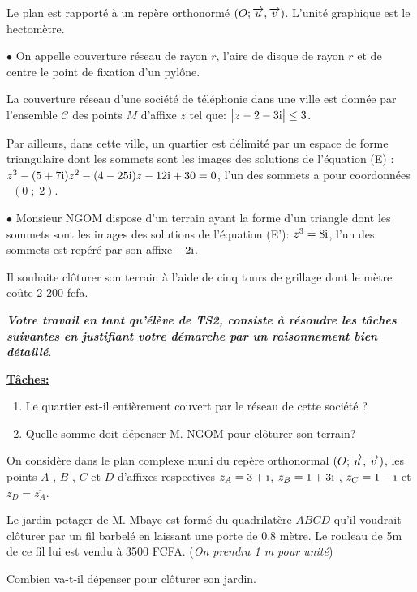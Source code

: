 \begin{exercice}
\noindent
Le plan  est rapporté à un repère  orthonormé $ (O ;\overrightarrow{u},\overrightarrow{v}) $. L'unité graphique  est le  hectomètre.
\medskip

\noindent\textbf{$  \bullet$}\; 
 On appelle couverture réseau de rayon $ r $, l'aire de disque de rayon $ r $ et de centre le point de fixation d'un pylône.

\noindent La couverture réseau d'une
société de téléphonie dans une ville  est donnée par l'ensemble  $\mathcal{C}$ des points $M$ d'affixe $z$ tel que:
 $ \bigl|z -2-3\text{i}\bigr| \leq 3$. 
 
 \smallskip
 \noindent Par ailleurs, dans cette ville, un quartier est délimité par un espace de forme triangulaire
dont les sommets sont les images des  solutions de l'équation (E) :\; 
  $ z^3 -(5+7\text{i})z^2 - (4-25\text{i})z -12\text{i}+30=0$, l'un des sommets a pour coordonnées \, $ (0  \; ; \;  2) $. 


\bigskip

\noindent \textbf{$  \bullet$}\;  Monsieur NGOM dispose d'un terrain ayant la forme d'un triangle dont les sommets sont 
les  images des solutions de  l'équation (E'):\; $ z^3=8\text{i} $,\; l'un des sommets est repéré par son affixe $ -2\text{i} $. 


\noindent  Il souhaite clôturer son terrain à l'aide de cinq tours de
grillage dont le mètre coûte 2 200 fcfa.




\medskip

\noindent  \textbf{\textit{Votre travail en tant qu'élève de TS2, consiste à résoudre les tâches suivantes en justifiant votre démarche par un raisonnement bien détaillé}}.

\medskip

\textbf{\underline{Tâches:}}
\begin{enumerate}
\item Le quartier est-il entièrement couvert par le réseau de cette société ?
\item Quelle somme doit dépenser  M. NGOM  pour clôturer son terrain?
\end{enumerate}
\end{exercice}

\begin{exercice}
 On considère dans le plan complexe muni du repère orthonormal $ (O ;\overrightarrow{u},\overrightarrow{v}) $, les points $A $ , $ B$ , $ C $  et $ D $ d'affixes respectives $ z_A=3+\text{i} $,\;  $z_B=1+3\text{i} $ \; , \;  $ z_C=1- \text{i} $ \; et \; $ z_D=\overline{z_A} $.

\medskip
 
  Le jardin potager de M. Mbaye  est formé du quadrilatère $ ABCD $ qu'il voudrait clôturer  par un fil barbelé en laissant une porte de $ 0.8 $ mètre. Le rouleau de 5m de
ce fil lui est vendu à 3500 FCFA. (\textit{On prendra 1 m pour unité})


 Combien va-t-il dépenser pour clôturer son jardin. 


\end{exercice}

